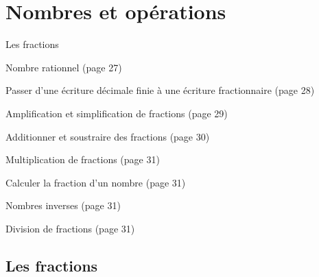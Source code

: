 \documentclass[a4paper,11pt]{report}
\begin{document}
\newcommand{\chapterName}{Nombres et opérations}
\newcommand{\serieName}{Les fractions}

\chapter*{\chapterName}
\thispagestyle{empty}


\begin{amL}{\serieName}{
\item Nombre rationnel (page 27)
\item Passer d'une écriture décimale finie à une écriture fractionnaire (page 28)
\item Amplification et simplification de fractions (page 29)
\item Additionner et soustraire des fractions (page 30)
\item Multiplication de fractions (page 31)
\item Calculer la fraction d'un nombre (page 31)
\item Nombres inverses (page 31)
\item Division de fractions (page 31)
}
\end{amL}



\section*{\serieName}
\setcounter{page}{1}


\begin{QSJ}{30}{1}
\end{QSJ}
\end{document}
